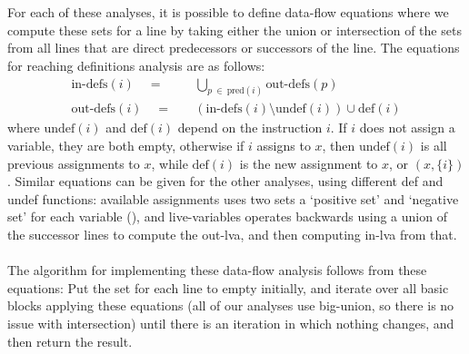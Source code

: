 \\\\
For each of these analyses, it is possible to define data-flow equations where we compute these sets for a line by taking either the union or intersection of the sets from all lines that are direct predecessors or successors of the line. The equations for reaching definitions analysis are as follows:
\begin{align*}
\text{in-defs}(i) \quad=&\quad \bigcup_{p\ \in\ \text{pred}(i)} \text{out-defs}(p) \\
\text{out-defs}(i) \quad=&\quad (\text{in-defs}(i) \setminus \text{undef}(i)) \cup \text{def}(i)
\end{align*}
where $\text{undef}(i)$ and $\text{def}(i)$ depend on the instruction $i$. If $i$ does not assign a variable, they are both empty, otherwise if $i$ assigns to $x$, then $\text{undef}(i)$ is all previous assignments to $x$, while $\text{def}(i)$ is the new assignment to $x$, or $(x, \{i\})$. Similar equations can be given for the other analyses, using different def and undef functions: available assignments uses two sets a `positive set' and `negative set' for each variable (), and live-variables operates backwards using a union of the successor lines to compute the out-lva, and then computing in-lva from that.
\\\\
The algorithm for implementing these data-flow analysis follows from these equations: Put the set for each line to empty initially, and iterate over all basic blocks applying these equations (all of our analyses use big-union, so there is no issue with intersection) until there is an iteration in which nothing changes, and then return the result. 

